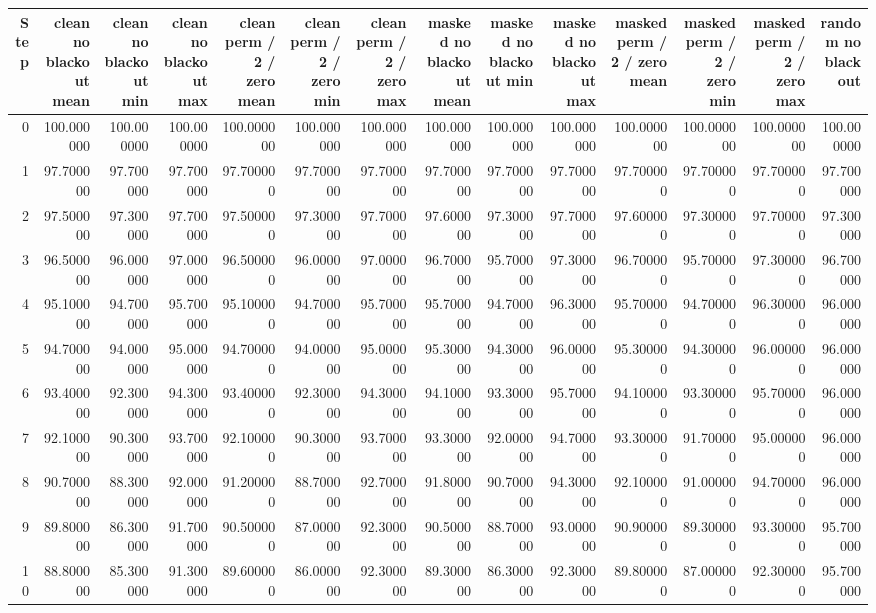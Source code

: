 \begin{tabular}{rrrrrrrrrrrrrr}
\toprule
Step & clean no blackout mean & clean no blackout min & clean no blackout max & clean perm / 2 / zero mean & clean perm / 2 / zero min & clean perm / 2 / zero max & masked no blackout mean & masked no blackout min & masked no blackout max & masked perm / 2 / zero mean & masked perm / 2 / zero min & masked perm / 2 / zero max & random no blackout \\
\midrule
0 & 100.000000 & 100.000000 & 100.000000 & 100.000000 & 100.000000 & 100.000000 & 100.000000 & 100.000000 & 100.000000 & 100.000000 & 100.000000 & 100.000000 & 100.000000 \\
1 & 97.700000 & 97.700000 & 97.700000 & 97.700000 & 97.700000 & 97.700000 & 97.700000 & 97.700000 & 97.700000 & 97.700000 & 97.700000 & 97.700000 & 97.700000 \\
2 & 97.500000 & 97.300000 & 97.700000 & 97.500000 & 97.300000 & 97.700000 & 97.600000 & 97.300000 & 97.700000 & 97.600000 & 97.300000 & 97.700000 & 97.300000 \\
3 & 96.500000 & 96.000000 & 97.000000 & 96.500000 & 96.000000 & 97.000000 & 96.700000 & 95.700000 & 97.300000 & 96.700000 & 95.700000 & 97.300000 & 96.700000 \\
4 & 95.100000 & 94.700000 & 95.700000 & 95.100000 & 94.700000 & 95.700000 & 95.700000 & 94.700000 & 96.300000 & 95.700000 & 94.700000 & 96.300000 & 96.000000 \\
5 & 94.700000 & 94.000000 & 95.000000 & 94.700000 & 94.000000 & 95.000000 & 95.300000 & 94.300000 & 96.000000 & 95.300000 & 94.300000 & 96.000000 & 96.000000 \\
6 & 93.400000 & 92.300000 & 94.300000 & 93.400000 & 92.300000 & 94.300000 & 94.100000 & 93.300000 & 95.700000 & 94.100000 & 93.300000 & 95.700000 & 96.000000 \\
7 & 92.100000 & 90.300000 & 93.700000 & 92.100000 & 90.300000 & 93.700000 & 93.300000 & 92.000000 & 94.700000 & 93.300000 & 91.700000 & 95.000000 & 96.000000 \\
8 & 90.700000 & 88.300000 & 92.000000 & 91.200000 & 88.700000 & 92.700000 & 91.800000 & 90.700000 & 94.300000 & 92.100000 & 91.000000 & 94.700000 & 96.000000 \\
9 & 89.800000 & 86.300000 & 91.700000 & 90.500000 & 87.000000 & 92.300000 & 90.500000 & 88.700000 & 93.000000 & 90.900000 & 89.300000 & 93.300000 & 95.700000 \\
10 & 88.800000 & 85.300000 & 91.300000 & 89.600000 & 86.000000 & 92.300000 & 89.300000 & 86.300000 & 92.300000 & 89.800000 & 87.000000 & 92.300000 & 95.700000 \\

\end{tabular}
